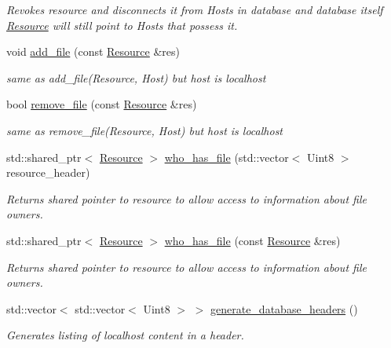 \begin{DoxyCompactItemize}
\begin{DoxyCompactList}\small\item\em Revokes resource and disconnects it from Hosts in database and database itself \hyperlink{classsimpleP2P_1_1Resource}{Resource} will still point to Hosts that possess it. \end{DoxyCompactList}\item 
void \hyperlink{classsimpleP2P_1_1Resource__Database_a8ac7f42f7de6f3281974d2be7f1ea8e8}{add\+\_\+file} (const \hyperlink{classsimpleP2P_1_1Resource}{Resource} \&res)
\begin{DoxyCompactList}\small\item\em same as add\+\_\+file(\+Resource, Host) but host is localhost \end{DoxyCompactList}\item 
bool \hyperlink{classsimpleP2P_1_1Resource__Database_aa7e7b4575b8217dc3e52fb741ff0474a}{remove\+\_\+file} (const \hyperlink{classsimpleP2P_1_1Resource}{Resource} \&res)
\begin{DoxyCompactList}\small\item\em same as remove\+\_\+file(\+Resource, Host) but host is localhost \end{DoxyCompactList}\item 
std\+::shared\+\_\+ptr$<$ \hyperlink{classsimpleP2P_1_1Resource}{Resource} $>$ \hyperlink{classsimpleP2P_1_1Resource__Database_ac1914413c36b5b1cf343aac6e9ba7a6f}{who\+\_\+has\+\_\+file} (std\+::vector$<$ Uint8 $>$ resource\+\_\+header)
\begin{DoxyCompactList}\small\item\em Returns shared pointer to resource to allow access to information about file owners. \end{DoxyCompactList}\item 
std\+::shared\+\_\+ptr$<$ \hyperlink{classsimpleP2P_1_1Resource}{Resource} $>$ \hyperlink{classsimpleP2P_1_1Resource__Database_a70aa9503db5700a6abdfdc9b029d71c1}{who\+\_\+has\+\_\+file} (const \hyperlink{classsimpleP2P_1_1Resource}{Resource} \&res)
\begin{DoxyCompactList}\small\item\em Returns shared pointer to resource to allow access to information about file owners. \end{DoxyCompactList}\item 
std\+::vector$<$ std\+::vector$<$ Uint8 $>$ $>$ \hyperlink{classsimpleP2P_1_1Resource__Database_a77b35fd391868164073005ffbd0377ae}{generate\+\_\+database\+\_\+headers} ()
\begin{DoxyCompactList}\small\item\em Generates listing of localhost content in a header. \end{DoxyCompactList}\item 

\end{DoxyCompactItemize}
